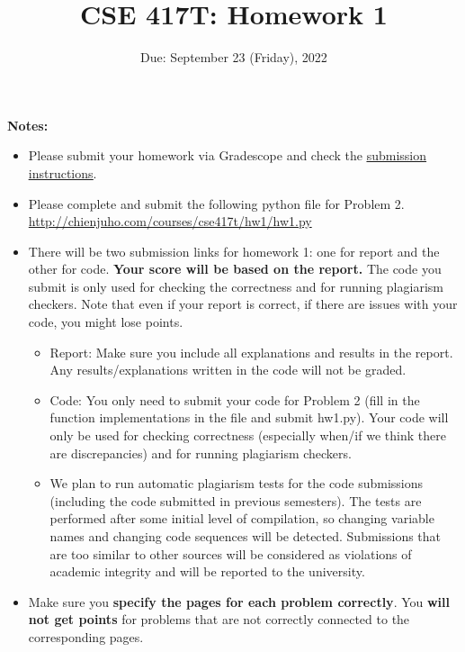 \documentclass[11pt]{article}
\begin{document}
\title{CSE 417T: Homework 1}
\date{Due: September 23 (Friday), 2022}

\maketitle

\noindent \textbf{Notes: } 
\begin{itemize}

\item Please submit your homework via Gradescope and check the \href{http://chienjuho.com/courses/cse417t/hw_instructions.html}{\underline{submission instructions}}.

\item Please complete and submit the following python file for Problem 2.\\
    \url{http://chienjuho.com/courses/cse417t/hw1/hw1.py}

\item There will be two submission links for homework 1: one for report and the other for code. \textbf{Your score will be based on the report.} 
The code you submit is only used for checking the correctness and for running plagiarism checkers. 
Note that even if your report is correct, if there are issues with your code, you might lose points. 

\begin{itemize}
    \item Report: Make sure you include all explanations and results in the report. Any results/explanations written in the code will not be graded. 
    \item Code: You only need to submit your code for Problem 2 (fill in the function implementations in the file and submit hw1.py). Your code will only be used for checking correctness (especially when/if we think there are discrepancies) and for running plagiarism checkers.
    \item We plan to run automatic plagiarism tests for the code submissions (including the code submitted in previous semesters). The tests are performed after some initial level of compilation, so changing variable names and changing code sequences will be detected. Submissions that are too similar to other sources will be considered as violations of academic integrity and will be reported to the university.
\end{itemize}

\item Make sure you \textbf{specify the pages for each problem correctly}. You \textbf{will not get points} for problems that are not correctly connected to the corresponding pages.


\end{itemize}
\end{document}
